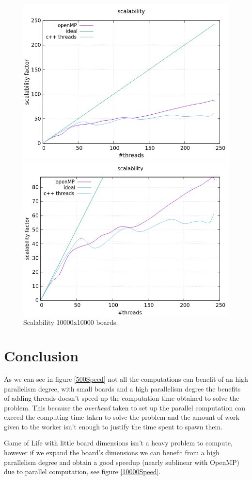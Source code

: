 \documentclass[a4paper,10pt]{article}
\begin{document}
\begin{figure}[H]
	\centering
	\begin{minipage}[t]{0.55\linewidth}
		\includegraphics[width=\linewidth]{10000_standard_scal.png}
	\end{minipage}%
	\begin{minipage}[t]{0.55\linewidth}
		\includegraphics[width=\linewidth]{10000_zoomed_scal.png}
	\end{minipage}
	\caption{Scalability 10000x10000 boards.}
	\label{10000Scal}
\end{figure}

\section{Conclusion}
As we can see in figure \ref{500Speed} not all the computations can benefit of an high parallelism degree, with small boards and a high parallelism degree the benefits of adding threads doesn't speed up the computation time obtained to solve the problem. This because the \textit{overhead} taken to set up the parallel computation can exceed the computing time taken to solve the problem and the amount of work given to the worker isn't enough to justify the time spent to spawn them. 

Game of Life with little board dimensions isn't a heavy problem to compute, however if we expand the board's dimensions we can benefit from a high parallelism degree and obtain a good speedup (nearly sublinear with OpenMP) due to parallel computation, see figure \ref{10000Speed}. 
\end{document}
